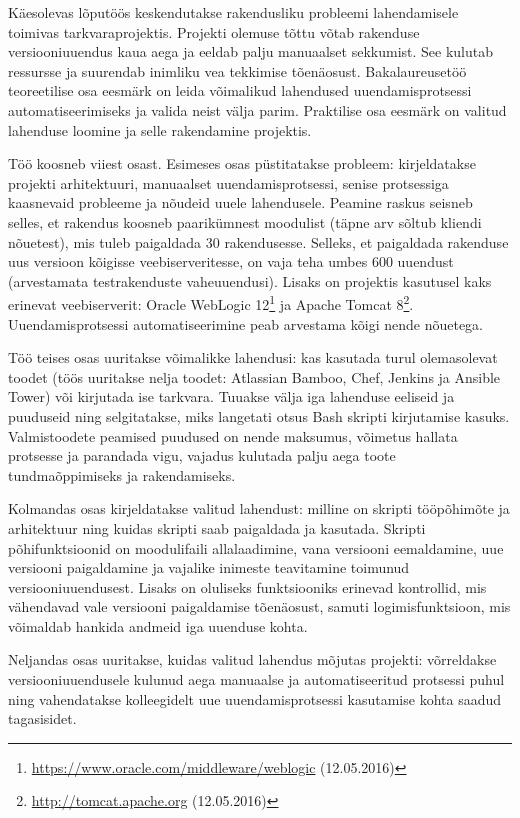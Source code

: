 \documentclass[12pt]{article}
\begin{document}
  Käesolevas lõputöös keskendutakse rakendusliku probleemi lahendamisele toimivas tarkvaraprojektis. Projekti olemuse tõttu võtab rakenduse versiooniuuendus kaua aega ja eeldab palju manuaalset sekkumist. See kulutab ressursse ja suurendab inimliku vea tekkimise tõenäosust. Bakalaureusetöö teoreetilise osa eesmärk on leida võimalikud lahendused uuendamisprotsessi automatiseerimiseks ja valida neist välja parim. Praktilise osa eesmärk on valitud lahenduse loomine ja selle rakendamine projektis.
  
  Töö koosneb viiest osast. Esimeses osas püstitatakse probleem: kirjeldatakse projekti arhitektuuri, manuaalset uuendamisprotsessi, senise protsessiga kaasnevaid probleeme ja nõudeid uuele lahendusele. Peamine raskus seisneb selles, et rakendus koosneb paarikümnest moodulist (täpne arv sõltub kliendi nõuetest), mis tuleb paigaldada 30 rakendusesse. Selleks, et paigaldada rakenduse uus versioon kõigisse veebiserveritesse, on vaja teha umbes 600 uuendust (arvestamata testrakenduste vaheuuendusi). Lisaks on projektis kasutusel kaks erinevat veebiserverit: Oracle WebLogic 12\footnote{\url{https://www.oracle.com/middleware/weblogic} (12.05.2016)} ja Apache Tomcat 8\footnote{\url{http://tomcat.apache.org} (12.05.2016)}. Uuendamisprotsessi automatiseerimine peab arvestama kõigi nende nõuetega.
  
  Töö teises osas uuritakse võimalikke lahendusi: kas kasutada turul olemasolevat toodet (töös uuritakse nelja toodet: Atlassian Bamboo, Chef, Jenkins ja Ansible Tower) või kirjutada ise tarkvara. Tuuakse välja iga lahenduse eeliseid ja puuduseid ning selgitatakse, miks langetati otsus Bash skripti kirjutamise kasuks. Valmistoodete peamised puudused on nende maksumus, võimetus hallata protsesse ja parandada vigu, vajadus kulutada palju aega toote tundmaõppimiseks ja rakendamiseks.
  
  Kolmandas osas kirjeldatakse valitud lahendust: milline on skripti tööpõhimõte ja arhitektuur ning kuidas skripti saab paigaldada ja kasutada. Skripti põhifunk\-tsioonid on moodulifaili allalaadimine, vana versiooni eemaldamine, uue versiooni paigaldamine ja vajalike inimeste teavitamine toimunud versiooniuuendusest. Lisaks on oluliseks funktsiooniks erinevad kontrollid, mis vähendavad vale versiooni paigaldamise tõenäosust, samuti logimisfunktsioon, mis võimaldab hankida andmeid iga uuenduse kohta.
  
  Neljandas osas uuritakse, kuidas valitud lahendus mõjutas projekti: võrreldakse versiooniuuendusele kulunud aega manuaalse ja automatiseeritud protsessi puhul ning vahendatakse kolleegidelt uue uuendamisprotsessi kasutamise kohta saadud tagasisidet.
  
\end{document}
